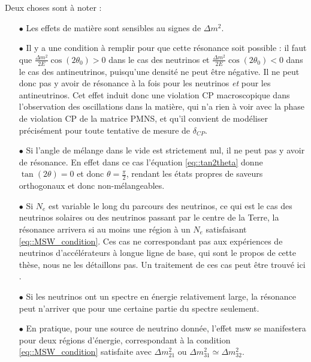             Deux choses sont à noter : 
            \begin{itemize}
            	\item[$\bullet$] Les effets de matière sont sensibles au signes de $\Delta m^2$.
                \item[$\bullet$] Il y a une condition à remplir pour que cette résonance soit possible : il faut que $\frac{\Delta m^2}{2E}\cos(2\theta_0) > 0$ dans le cas des neutrinos et $\frac{\Delta m^2}{2E}\cos(2\theta_0) < 0$ dans le cas des antineutrinos, puisqu'une densité ne peut être négative. Il ne peut donc pas y avoir de résonance à la fois pour les neutrinos \textit{et} pour les antineutrinos. Cet effet induit donc une violation CP macroscopique dans l'observation des oscillations dans la matière, qui n'a rien à voir avec la phase de violation CP de la matrice PMNS, et qu'il convient de modéliser précisément pour toute tentative de mesure de $\delta_{CP}$.
                \item[$\bullet$] Si l'angle de mélange dans le vide est strictement nul, il ne peut pas y avoir de résonance. En effet dans ce cas l'équation \eqref{eq::tan2theta} donne $\tan(2\theta)=0$ et donc $\theta=\frac{\pi}{2}$, rendant les états propres de saveurs orthogonaux et donc non-mélangeables.
                \item[$\bullet$] Si $N_e$ est variable le long du parcours des neutrinos, ce qui est le cas des neutrinos solaires ou des neutrinos passant par le centre de la Terre, la résonance arrivera si au moins une région à un $N_e$ satisfaisant \eqref{eq::MSW_condition}. Ces cas ne correspondant pas aux expériences de neutrinos d'accélérateurs à longue ligne de base, qui sont le propos de cette thèse, nous ne les détaillons pas. Un traitement de ces cas peut être trouvé ici \cite{Akhmedov2000}.
                \item[$\bullet$] Si les neutrinos ont un spectre en énergie relativement large, la résonance peut n'arriver que pour une certaine partie du spectre seulement.
                \item[$\bullet$] En pratique, pour une source de neutrino donnée, l'effet \gls{msw} se manifestera pour deux régions d'énergie, correspondant à la condition \eqref{eq::MSW_condition} satisfaite avec $\Delta m^2_{21}$ ou $\Delta m^2_{31}\simeq\Delta m^2_{32}$.
            \end{itemize}
                
            
